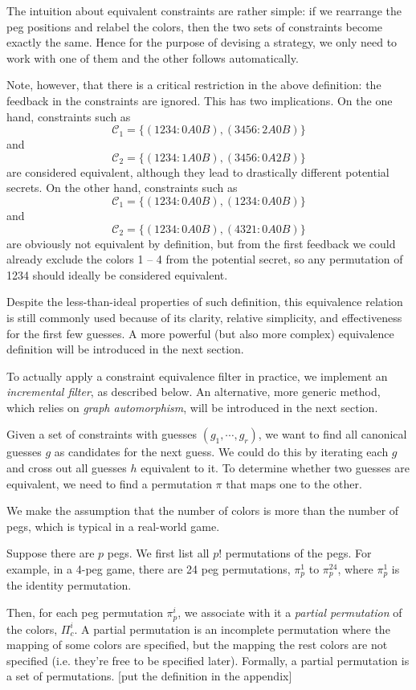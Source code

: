 The intuition about equivalent constraints are rather simple: if we rearrange the peg positions and relabel the colors, then the two sets of constraints become exactly the same. Hence for the purpose of devising a strategy, we only need to work with one of them and the other follows automatically.

Note, however, that there is a critical restriction in the above definition: the feedback in the constraints are ignored. This has two implications. On the one hand, constraints such as 
\[
\mathcal{C}_1 = \{ (1234:0A0B), (3456:2A0B) \}
\]
and
\[
\mathcal{C}_2 = \{ (1234:1A0B), (3456:0A2B) \}
\]
are considered equivalent, although they lead to drastically different potential secrets. On the other hand, constraints such as
\[
\mathcal{C}_1 = \{ (1234:0A0B), (1234:0A0B) \}
\]
and
\[
\mathcal{C}_2 = \{ (1234:0A0B), (4321:0A0B) \}
\]
are obviously not equivalent by definition, but from the first feedback  we could already exclude the colors 1 -- 4 from the potential secret, so any permutation of 1234 should ideally be considered equivalent.

Despite the less-than-ideal properties of such definition, this equivalence relation is still commonly used \cite{neuwirth81,koyama93,francis10} because of its clarity, relative simplicity, and effectiveness for the first few guesses. A more powerful (but also more complex) equivalence definition will be introduced in the next section.

To actually apply a constraint equivalence filter in practice, we implement an \emph{incremental filter}, as described below. An alternative, more generic method, which relies on \emph{graph automorphism}, will be introduced in the next section.

Given a set of constraints with guesses $(g_1,\cdots,g_r)$, we want to find all canonical guesses $g$ as candidates for the next guess. We could do this by iterating each $g$ and cross out all guesses $h$ equivalent to it. To determine whether two guesses are equivalent, we need to find a permutation $\pi$ that maps one to the other.

We make the assumption that the number of colors is more than the number of pegs, which is typical in a real-world game.

Suppose there are $p$ pegs. We first list all $p!$ permutations of the pegs. For example, in a 4-peg game, there are 24 peg permutations, $\pi_p^1$ to $\pi_p^{24}$, where $\pi_p^1$ is the identity permutation.

Then, for each peg permutation $\pi_p^i$, we associate with it a \emph{partial permutation} of the colors, $\Pi_c^i$. A partial permutation is an incomplete permutation where the mapping of some colors are specified, but the mapping the rest colors are not specified (i.e. they're free to be specified later). Formally, a partial permutation is a set of permutations. [put the definition in the appendix]

